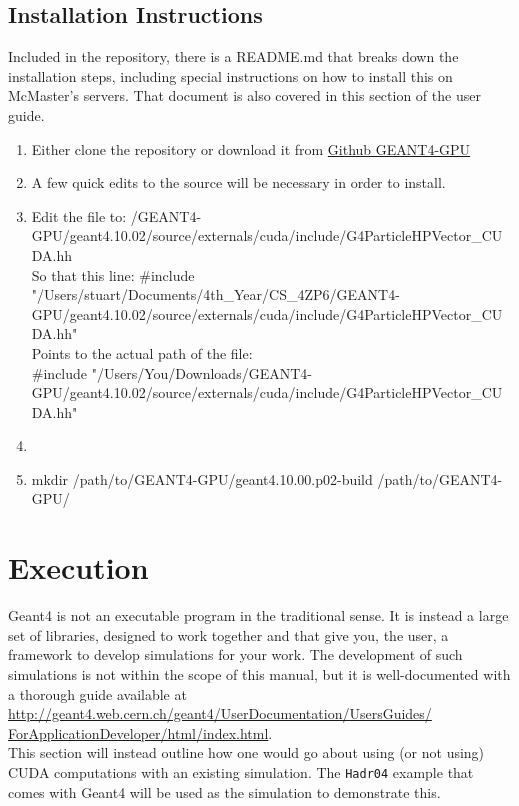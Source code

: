 \documentclass[12pt]{article}
\begin{document}
\subsection{Installation Instructions} %
Included in the repository, there is a README.md that breaks down the installation steps, including special instructions on how to install this on McMaster's servers. That document is also covered in this section of the user guide. \\
\begin{enumerate}
\item Either clone the repository or download it from \href{https://github.com/studouglas/GEANT4-GPU}{Github GEANT4-GPU}
\item A few quick edits to the source will be necessary in order to install.
\item Edit the file to:   /GEANT4-GPU/geant4.10.02/source/externals/cuda/include/G4ParticleHPVector_CUDA.hh \\
So that this line:
#include "/Users/stuart/Documents/4th_Year/CS_4ZP6/GEANT4-GPU/geant4.10.02/source/externals/cuda/include/G4ParticleHPVector_CUDA.hh"\\
 Points to the actual path of the file:\\
#include "/Users/You/Downloads/GEANT4-GPU/geant4.10.02/source/externals/cuda/include/G4ParticleHPVector_CUDA.hh"
\item 
\item mkdir /path/to/GEANT4-GPU/geant4.10.00.p02-build /path/to/GEANT4-GPU/
\end{enumerate}
\section{Execution} %
Geant4 is not an executable program in the traditional sense. It is instead a large set of libraries, designed to work together and that give you, the user, a framework to develop simulations for your work. The development of such simulations is not within the scope of this manual, but it is well-documented with a thorough guide available at \url{http://geant4.web.cern.ch/geant4/UserDocumentation/UsersGuides/ ForApplicationDeveloper/html/index.html}.\\

This section will instead outline how one would go about using (or not using) CUDA computations with an existing simulation. The \texttt{Hadr04} example that comes with Geant4 will be used as the simulation to demonstrate this.
\end{document}
